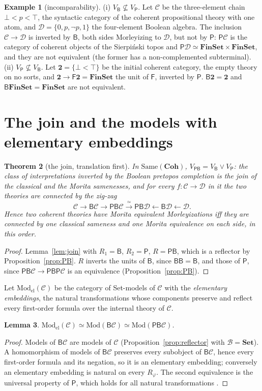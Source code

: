 \documentclass[11pt]{amsart}
\newtheorem{thm}{Theorem}[section]
\newtheorem{lem}[thm]{Lemma}
\theoremstyle{definition}
\newtheorem{ex}[thm]{Example}
\newcommand{\Same}{\mathrm{Same}}
\newcommand{\Coh}{\mathbf{Coh}}
\newcommand{\Mod}{\mathrm{Mod}}
\newcommand{\Model}{\mathrm{Mod}_{\mathrm{el}}}
\newcommand{\Set}{\mathbf{Set}}
\newcommand{\FF}{\mathsf F}
\newcommand{\PP}{\mathsf P}
\newcommand{\BB}{\mathsf B}
\newcommand{\cC}{\mathcal C}
\newcommand{\cD}{\mathcal D}
\newcommand{\Fin}{\mathbf{FinSet}}
\begin{document}
\begin{ex}[incomparability]\label{ex:incomp}
(i) $V_\BB\not\subseteq V_\PP$. Let $\cC$ be the three-element chain
$\bot<p<\top$, the syntactic category of the coherent propositional
theory with one atom, and $\cD=\{0,p,\neg p,1\}$ the four-element
Boolean algebra. The inclusion $\cC\to\cD$ is inverted by $\BB$, both
sides Morleyizing to $\cD$, but not by $\PP$: $\PP\cC$ is the category of
coherent objects of the Sierpi\'nski topos and $\PP\cD\simeq\Fin\times
\Fin$, and they are not equivalent (the former has a non-complemented
subterminal).
(ii) $V_\PP\not\subseteq V_\BB$. Let $\mathbf 2=\{\bot<\top\}$ be the
initial coherent category, the empty theory on no sorts, and $\mathbf
2\to\FF\mathbf 2=\Fin$ the unit of $\FF$, inverted by $\PP$. $\BB\mathbf
2=\mathbf 2$ and $\BB\Fin=\Fin$ are not equivalent.
\end{ex}

\section{The join and the models with elementary embeddings}\label{sec:join}

\begin{thm}[the join, translation first]\label{thm:join}
In $\Same(\Coh)$, $V_{\PP\BB}=V_\BB\vee V_\PP$: the class of
interpretations inverted by the Boolean pretopos completion is the join
of the classical and the Morita samenesses, and for every $f\colon\cC\to\cD$
in it the two theories are connected by the zig-zag
\[
\cC\to\BB\cC\to\PP\BB\cC\xrightarrow{\ \simeq\ }\PP\BB\cD\leftarrow\BB\cD
\leftarrow\cD.
\]
Hence two coherent theories have Morita equivalent Morleyizations iff
they are connected by one classical sameness and one Morita equivalence
on each side, in this order.
\end{thm}
\begin{proof}
Lemma~\ref{lem:join} with $R_1=\BB$, $R_2=\PP$, $R=\PP\BB$, which is a
reflector by Proposition~\ref{prop:PB}. $R$ inverts the units of $\BB$,
since $\BB\BB=\BB$, and those of $\PP$, since $\PP\BB\cC\to\PP\BB\PP\cC$
is an equivalence (Proposition~\ref{prop:PB}).
\end{proof}

Let $\Model(\cC)$ be the category of Set-models of $\cC$ with the
\emph{elementary embeddings}, the natural transformations whose
components preserve and reflect every first-order formula over the
internal theory of $\cC$.

\begin{lem}\label{lem:modeq}
$\Model(\cC)\simeq\Mod(\BB\cC)\simeq\Mod(\PP\BB\cC)$.
\end{lem}
\begin{proof}
Models of $\BB\cC$ are models of $\cC$ (Proposition~\ref{prop:reflector}
with $\mathcal B=\Set$). A homomorphism of models of $\BB\cC$ preserves
every subobject of $\BB\cC$, hence every first-order formula and its
negation, so it is an elementary embedding; conversely an elementary
embedding is natural on every $R_\varphi$. The second equivalence is the
universal property of $\PP$, which holds for all natural transformations
\cite[A3.3]{Elephant}.
\end{proof}
\end{document}
